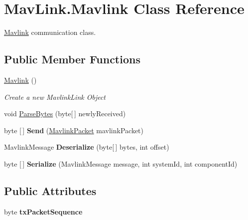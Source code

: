 \hypertarget{classMavLink_1_1Mavlink}{}\section{Mav\+Link.\+Mavlink Class Reference}
\label{classMavLink_1_1Mavlink}


\hyperlink{classMavLink_1_1Mavlink}{Mavlink} communication class.  


\subsection*{Public Member Functions}
\begin{DoxyCompactItemize}
\item 
\hyperlink{classMavLink_1_1Mavlink_afe31f241e14b7a9df43494c3f777055f}{Mavlink} ()
\begin{DoxyCompactList}\small\item\em Create a new Mavlink\+Link Object \end{DoxyCompactList}\item 
void \hyperlink{classMavLink_1_1Mavlink_a2a1e66a440c767a640c92f00bdf5354d}{Parse\+Bytes} (byte\mbox{[}$\,$\mbox{]} newly\+Received)
\item 
\mbox{\label{classMavLink_1_1Mavlink_a62a72045b3c41e9aade642a94af528aa}} 
byte \mbox{[}$\,$\mbox{]} {\bfseries Send} (\hyperlink{classMavLink_1_1MavlinkPacket}{Mavlink\+Packet} mavlink\+Packet)
\item 
\mbox{\label{classMavLink_1_1Mavlink_aeffd42986158db41e1e7151ae5d899f3}} 
Mavlink\+Message {\bfseries Deserialize} (byte\mbox{[}$\,$\mbox{]} bytes, int offset)
\item 
\mbox{\label{classMavLink_1_1Mavlink_ac10d67e2fbfb6e4ef9bc905b5ef2206b}} 
byte \mbox{[}$\,$\mbox{]} {\bfseries Serialize} (Mavlink\+Message message, int system\+Id, int component\+Id)
\end{DoxyCompactItemize}
\subsection*{Public Attributes}
\begin{DoxyCompactItemize}
\item 
\mbox{\label{classMavLink_1_1Mavlink_a0bba1cc5192a639aead91672c03fdd96}} 
byte {\bfseries tx\+Packet\+Sequence}
\end{DoxyCompactItemize}
